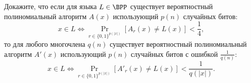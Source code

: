 Докажите, что если для языка $L \in \BPP$ существует вероятностный полиномиальный алгоритм $A(x)$
использующий $p(n)$ случайных битов:
$$
    x \in L \Leftrightarrow \Pr\limits_{r \in \{0, 1\}^{p(|x|)}}[A_r(x) \neq L(x)] < \frac{1}{4},
$$
то для любого многочлена $q(n)$ существует вероятностный полиномиальный алгоритм $A'(x)$ использующий
$p(n)$ случайных битов с ошибкой $\frac{1}{q(n)}$:
$$
    x \in L \Leftrightarrow \Pr\limits_{r \in \{0, 1\}^{p(|x|)}}[A'_r(x) \neq L(x)] < \frac{1}{q(|x|)}.
$$
